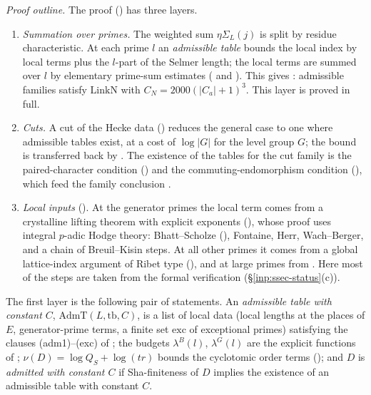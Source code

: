 \documentclass[10pt]{amsart}
\theoremstyle{definition}
\theoremstyle{remark}
\begin{document}
\emph{Proof outline.} The proof (\cite[\S\S\ref{A-i2:ssec-perprime}--\ref{A-i2:ssec-local}]{Annex})
has three layers.
\begin{enumerate}
\item \emph{Summation over primes.} The weighted sum $\eta\Sigma_L(j)$ is
split by residue characteristic. At each prime $l$ an \emph{admissible
table} bounds the local index by local terms plus the $l$-part of the
Selmer length; the local terms are summed over $l$ by elementary
prime-sum estimates (\cite[Theorem~\ref{A-i2:thm-summed}]{Annex} and
\cite[Proposition~\ref{A-i2:prop-point}]{Annex}). This gives
\cite[Theorem~\ref{A-i2:thm-export}]{Annex}: admissible families satisfy
$\mathrm{LinkN}$ with $C_N=2000(|C_a|+1)^3$. This layer is proved in full.
\item \emph{Cuts.} A cut of the Hecke data
(\cite[Proposition~\ref{A-i2:prop-cut}]{Annex}) reduces the general case to
one where admissible tables exist, at a cost of $\log|G|$ for the level
group $G$; the bound is transferred back by
\cite[Theorem~\ref{A-i2:thm-transfer}]{Annex}. The existence of the tables
for the cut family is the paired-character condition
(\cite[Proposition~\ref{A-i2:prop-pcc}]{Annex}) and the commuting-endomorphism
condition (\cite[Proposition~\ref{A-i2:prop-cec}]{Annex}), which feed the
family conclusion \cite[Proposition~\ref{A-i2:prop-conclF}]{Annex}.
\item \emph{Local inputs} (\cite[\S\ref{A-i2:ssec-local}]{Annex}). At the
generator primes the local term comes from a crystalline lifting theorem
with explicit exponents (\cite[Proposition~\ref{A-i2:prop-lift}]{Annex}),
whose proof uses integral $p$-adic Hodge theory: Bhatt--Scholze
(\cite[Theorem~\ref{A-i2:thm-bs}]{Annex}), Fontaine, Herr, Wach--Berger, and
a chain of Breuil--Kisin steps. At all other primes it comes from a global
lattice-index argument of Ribet type
(\cite[Proposition~\ref{A-i2:prop-selmer}]{Annex}), and at large primes from
\cite[Proposition~\ref{A-i2:prop-large}]{Annex}. Here most of the steps are
taken from the formal verification (\S\ref{inp:ssec-status}(c)).
\end{enumerate}

The first layer is the following pair of statements. An \emph{admissible
table with constant $C$}, $\mathrm{AdmT}(L,\mathrm{tb},C)$, is a list of
local data (local lengths at the places of $E$, generator-prime terms, a
finite set $\mathrm{exc}$ of exceptional primes) satisfying the
clauses (adm1)--(exc) of \cite[Definition~\ref{A-i2:def-AdmT}]{Annex}; the
budgets $\lambda^B(l)$, $\lambda^G(l)$ are the explicit functions of
\cite[Definition~\ref{A-i2:def-budgets}]{Annex}; $\nu(D)=\log Q_S+\log(tr)$
bounds the cyclotomic order terms (\cite[Lemma~\ref{A-i2:lem-nu}]{Annex}); and $D$ is
\emph{admitted with constant $C$} if Sha-finiteness of $D$ implies the
existence of an admissible table with constant $C$.
\end{document}
